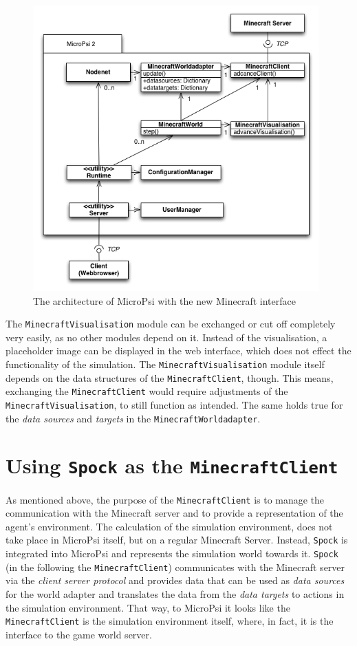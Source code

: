 \begin{figure}[h]
  \centering
    \includegraphics[width=11cm]{graphics/UML_MicroPsi_mit_spock_v15}
  \caption{The architecture of MicroPsi with the new Minecraft interface}
  \label{uml_mc}
\end{figure}

The \texttt{MinecraftVisualisation} module can be exchanged or cut off completely very easily, as no other modules depend on it. Instead of the visualisation, a placeholder image can be displayed in the web interface, which does not effect the functionality of the simulation. The \texttt{MinecraftVisualisation} module itself depends on the data structures of the \texttt{MinecraftClient}, though. This means, exchanging the \texttt{MinecraftClient} would require adjustments of the \texttt{MinecraftVisualisation}, to still function as intended. The same holds true for the \emph{data sources} and \emph{targets} in the \texttt{MinecraftWorldadapter}.

    \section{Using \texttt{Spock} as the \texttt{MinecraftClient}}

As mentioned above, the purpose of the \texttt{MinecraftClient} is to manage the communication with the Minecraft server and to provide a representation of the agent's environment. The calculation of the simulation environment, does not take place in MicroPsi itself, but on a regular Minecraft Server. Instead, \texttt{Spock} is integrated into MicroPsi and represents the simulation world towards it. \texttt{Spock} (in the following the \texttt{MinecraftClient}) communicates with the Minecraft server via the \emph{client server protocol} and provides data that can be used as \emph{data sources} for the world adapter and translates the data from the \emph{data targets} to actions in the simulation environment. That way, to MicroPsi it looks like the \texttt{MinecraftClient} is the simulation environment itself, where, in fact, it is the interface to the game world server.

